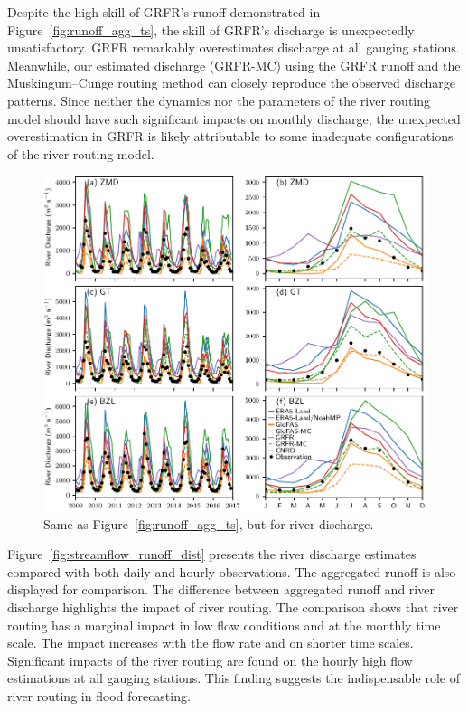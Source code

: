 \documentclass[water,article,submit,pdftex,moreauthors]{Definitions/mdpi}
\begin{document}
Despite the high skill of GRFR's runoff demonstrated in Figure~\ref{fig:runoff_agg_ts}, the skill of GRFR's discharge is unexpectedly unsatisfactory. GRFR remarkably overestimates discharge at all gauging stations. Meanwhile, our estimated discharge (GRFR-MC) using the GRFR runoff and the Muskingum--Cunge routing method can closely reproduce the observed discharge patterns. Since neither the dynamics nor the parameters of the river routing model should have such significant impacts on monthly discharge, the unexpected overestimation in GRFR is likely attributable to some inadequate configurations of the river routing model.

\begin{figure}[H]
  \centering
  \includegraphics[width=\textwidth]{streamflow_ts.pdf}
  \caption{Same as Figure~\ref{fig:runoff_agg_ts}, but for river discharge.}
  \label{fig:streamflow_ts}
\end{figure}

Figure~\ref{fig:streamflow_runoff_dist} presents the river discharge estimates compared with both daily and hourly observations. The aggregated runoff is also displayed for comparison. The difference between aggregated runoff and river discharge highlights the impact of river routing. The comparison shows that river routing has a marginal impact in low flow conditions and at the monthly time scale. The impact increases with the flow rate and on shorter time scales. Significant impacts of the river routing are found on the hourly high flow estimations at all gauging stations. This finding suggests the indispensable role of river routing in flood forecasting.
\end{document}
